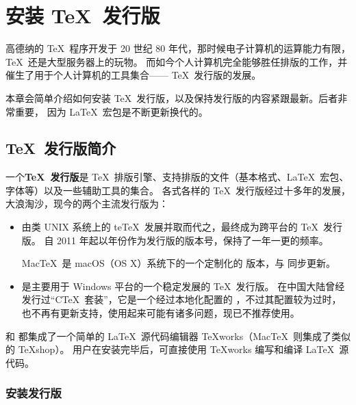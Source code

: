 \chapter{安装 \protect\TeX\ 发行版}\label{app:install}

\begin{intro}
高德纳的 \TeX\ 程序开发于 20 世纪 80 年代，那时候电子计算机的运算能力有限，\TeX\ 还是大型服务器上的玩物。
而如今个人计算机完全能够胜任排版的工作，并催生了用于个人计算机的工具集合—— \TeX\ 发行版的发展。

本章会简单介绍如何安装 \TeX\ 发行版，以及保持发行版的内容紧跟最新。后者非常重要，
因为 \LaTeX\ 宏包是不断更新换代的。
\end{intro}

\section{\protect\TeX\ 发行版简介}\label{sec:dists}

一个\textbf{\TeX\ 发行版}是 \TeX\ 排版引擎、支持排版的文件（基本格式、\LaTeX\ 宏包、字体等）以及一些辅助工具的集合。
各式各样的 \TeX\ 发行版经过十多年的发展，大浪淘沙，现今的两个主流发行版为：
\begin{itemize}
  \item \textbf{}\par
   由类 UNIX 系统上的 te\TeX\ 发展并取而代之，最终成为跨平台的 \TeX\ 发行版。
   自 2011 年起以年份作为发行版的版本号，保持了一年一更的频率。

  Mac\TeX\ 是 macOS（OS X）系统下的一个定制化的  版本，与  同步更新。

  \item \textbf{}\par
   是主要用于 Windows 平台的一个稳定发展的 \TeX\ 发行版。
  在中国大陆曾经发行过“C\TeX\ 套装”，它是一个经过本地化配置的 ，不过其配置较为过时，也不再有更新支持，使用起来可能有诸多问题，现已不推荐使用。
\end{itemize}

 和  都集成了一个简单的 \LaTeX\ 源代码编辑器 \TeX works（Mac\TeX\ 则集成了类似的 \TeX shop）。
用户在安装完毕后，可直接使用 \TeX works 编写和编译 \LaTeX\ 源代码。

\subsection{安装发行版}\label{subsec:install-dists}

